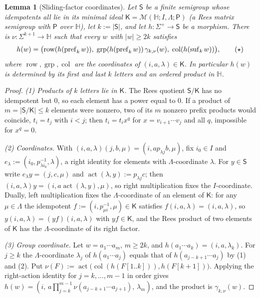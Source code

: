 \documentclass[11pt]{article}
\numberwithin{equation}{section}
\theoremstyle{plain}
\newtheorem{lemma}[theorem]{Lemma}
\theoremstyle{definition}
\theoremstyle{remark}
\begin{document}
\begin{lemma}[Sliding-factor coordinates]
\label{lem:lg-rees-window-coordinate}
Let $\mathsf S$ be a finite semigroup whose idempotents all lie in its minimal ideal
$\mathsf K=\mathcal M({\mathbb H};I,\Lambda;\mathsf P)$ (a Rees matrix semigroup with $\mathsf P$ over ${\mathbb H}$), let
$k:=|\mathsf S|$, and let $h:\Sigma^+\to \mathsf S$ be a morphism.  There is
$\nu:\Sigma^{k+1}\to {\mathbb H}$ such that every $w$ with $|w|\ge2k$ satisfies
\[
 h(w)=\bigl(\operatorname{row}(h(\operatorname{pref}_kw)),\;
 \operatorname{grp}(h(\operatorname{pref}_kw))\,\gamma_{k,\nu}(w),\;
 \operatorname{col}(h(\operatorname{suf}_kw))\bigr),
 \tag{\ensuremath{\star}}
\]
where $\operatorname{row},\operatorname{grp},\operatorname{col}$ are the coordinates of
$(i,a,\lambda)\in\mathsf K$.  In particular $h(w)$ is determined by its first and last
$k$ letters and an ordered product in ${\mathbb H}$.
\end{lemma}

\begin{proof}
\emph{(1) Products of $k$ letters lie in $\mathsf K$.}  The Rees quotient $\mathsf S/\mathsf K$
has no idempotent but $0$, so each element has a power equal to $0$.  If a product of
$m=|\mathsf S/\mathsf K|\le k$ elements were nonzero, two of its $m$ nonzero prefix products
would coincide, $t_i=t_j$ with $i<j$; then $t_i=t_ix^q$ for $x=v_{i+1}\cdots v_j$ and
all $q$, impossible for $x^q=0$.

\emph{(2) Coordinates.}  With $(i,a,\lambda)(j,b,\mu)=(i,ap_{\lambda j}b,\mu)$, fix
$i_0\in I$ and $e_\lambda:=(i_0,p_{\lambda i_0}^{-1},\lambda)$, a right identity for
elements with $\Lambda$-coordinate $\lambda$.  For $y\in \mathsf S$ write
$e_\lambda y=(j,c,\mu)$ and $\operatorname{act}(\lambda,y):=p_{\lambda j}c$; then
$(i,a,\lambda)y=(i,a\operatorname{act}(\lambda,y),\mu)$, so right multiplication fixes the
$I$-coordinate.  Dually, left multiplication fixes the $\Lambda$-coordinate of an
element of $\mathsf K$: for any $\mu\in\Lambda$ the idempotent
$f:=(i,p_{\mu i}^{-1},\mu)\in\mathsf K$ satisfies $f(i,a,\lambda)=(i,a,\lambda)$, so
$y(i,a,\lambda)=(yf)(i,a,\lambda)$ with $yf\in\mathsf K$, and the Rees product of two
elements of $\mathsf K$ has the $\Lambda$-coordinate of its right factor.

\emph{(3) Group coordinate.}  Let $w=a_1\cdots a_m$, $m\ge2k$, and
$h(a_1\cdots a_k)=(i,a,\lambda_k)$.  For $j\ge k$ the $\Lambda$-coordinate $\lambda_j$
of $h(a_1\cdots a_j)$ equals that of $h(a_{j-k+1}\cdots a_j)$ by (1) and (2).  Put
$\nu(F):=\operatorname{act}\bigl(\operatorname{col}(h(F[1..k])),h(F[k+1])\bigr)$.  Applying the
right-action identity for $j=k,\ldots,m-1$ in order gives
$h(w)=(i,\,a\prod_{j=k}^{m-1}\nu(a_{j-k+1}\cdots a_{j+1}),\,\lambda_m)$, and the
product is $\gamma_{k,\nu}(w)$.
\end{proof}
\end{document}
